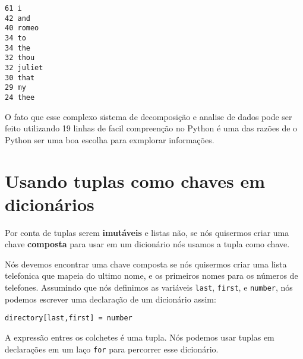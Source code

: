 \beforeverb
\begin{verbatim}
61 i
42 and
40 romeo
34 to
34 the
32 thou
32 juliet
30 that
29 my
24 thee
\end{verbatim}
\afterverb
%
O fato que esse complexo sistema de decomposição e analise de dados
pode ser feito utilizando 19 linhas de facil compreenção no Python
é uma das razões de o Python ser uma boa escolha para
exmplorar informações.

\section{Usando tuplas como chaves em dicionários}


Por conta de tuplas serem {\bf imutáveis} e listas não, se nós quisermos
criar uma chave {\bf composta} para usar em um dicionário nós usamos a 
tupla como chave.

Nós devemos encontrar uma chave composta se nós quisermos criar
uma lista telefonica que mapeia do ultimo nome, e os primeiros nomes
para os números de telefones. Assumindo que nós definimos as
variáveis {\tt last}, {\tt first}, e {\tt number}, nós podemos
escrever uma declaração de um dicionário assim:

\beforeverb
\begin{verbatim}
directory[last,first] = number
\end{verbatim}
\afterverb
%
A expressão entres os colchetes é uma tupla. Nós podemos usar
tuplas em declarações em um laço {\tt for} para percorrer esse
dicionário.

